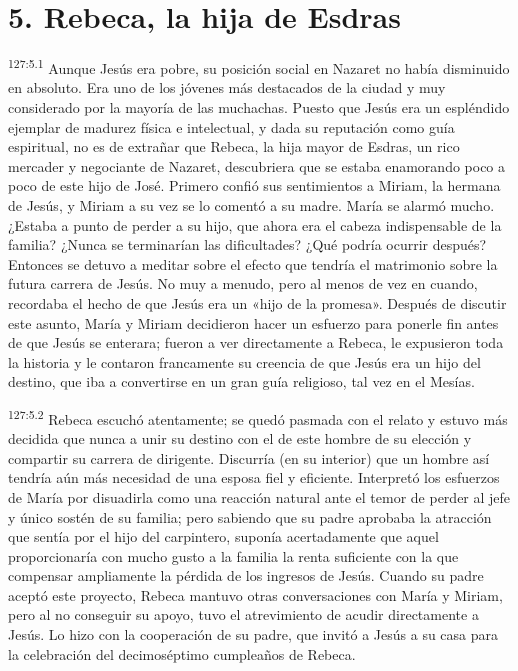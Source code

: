 \section*{5. Rebeca, la hija de Esdras}
\par
\textsuperscript{127:5.1} Aunque Jesús era pobre, su posición social en Nazaret no había disminuido en absoluto. Era uno de los jóvenes más destacados de la ciudad y muy considerado por la mayoría de las muchachas. Puesto que Jesús era un espléndido ejemplar de madurez física e intelectual, y dada su reputación como guía espiritual, no es de extrañar que Rebeca, la hija mayor de Esdras, un rico mercader y negociante de Nazaret, descubriera que se estaba enamorando poco a poco de este hijo de José. Primero confió sus sentimientos a Miriam, la hermana de Jesús, y Miriam a su vez se lo comentó a su madre. María se alarmó mucho. ¿Estaba a punto de perder a su hijo, que ahora era el cabeza indispensable de la familia? ¿Nunca se terminarían las dificultades? ¿Qué podría ocurrir después? Entonces se detuvo a meditar sobre el efecto que tendría el matrimonio sobre la futura carrera de Jesús. No muy a menudo, pero al menos de vez en cuando, recordaba el hecho de que Jesús era un «hijo de la promesa». Después de discutir este asunto, María y Miriam decidieron hacer un esfuerzo para ponerle fin antes de que Jesús se enterara; fueron a ver directamente a Rebeca, le expusieron toda la historia y le contaron francamente su creencia de que Jesús era un hijo del destino, que iba a convertirse en un gran guía religioso, tal vez en el Mesías.

\par
\textsuperscript{127:5.2} Rebeca escuchó atentamente; se quedó pasmada con el relato y estuvo más decidida que nunca a unir su destino con el de este hombre de su elección y compartir su carrera de dirigente. Discurría (en su interior) que un hombre así tendría aún más necesidad de una esposa fiel y eficiente. Interpretó los esfuerzos de María por disuadirla como una reacción natural ante el temor de perder al jefe y único sostén de su familia; pero sabiendo que su padre aprobaba la atracción que sentía por el hijo del carpintero, suponía acertadamente que aquel proporcionaría con mucho gusto a la familia la renta suficiente con la que compensar ampliamente la pérdida de los ingresos de Jesús. Cuando su padre aceptó este proyecto, Rebeca mantuvo otras conversaciones con María y Miriam, pero al no conseguir su apoyo, tuvo el atrevimiento de acudir directamente a Jesús. Lo hizo con la cooperación de su padre, que invitó a Jesús a su casa para la celebración del decimoséptimo cumpleaños de Rebeca.

